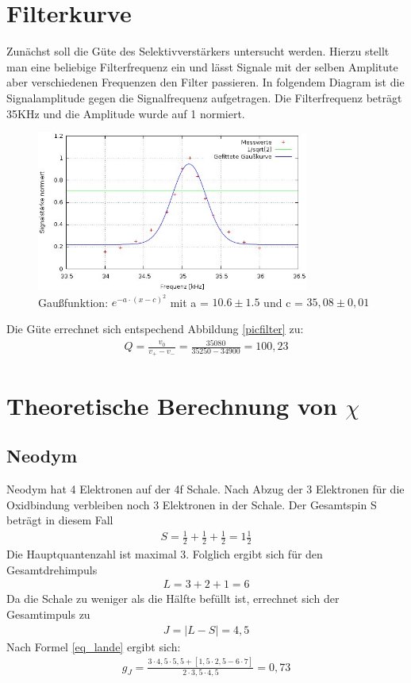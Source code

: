 \section{Filterkurve}
Zunächst soll die Güte des Selektivverstärkers untersucht werden. Hierzu stellt man eine beliebige Filterfrequenz ein und lässt Signale mit der selben Amplitute aber verschiedenen Frequenzen den Filter passieren. In folgendem Diagram ist die Signalamplitude gegen die Signalfrequenz aufgetragen. Die Filterfrequenz beträgt 35KHz und die Amplitude wurde auf 1 normiert.
\begin{figure}[htbp]
\includegraphics[width=0.8\textwidth]{pics/guete.jpg}
\caption{Gaußfunktion: $e^{-a\cdot (x-c)^2}$ mit a = $10.6\pm 1.5$ und c = $35,08 \pm 0,01$}
\end{figure}

Die Güte errechnet sich entspechend Abbildung \ref{picfilter} zu:
\begin{align*}
Q=\frac{v_0}{v_+ - v_-}=\frac{35080}{35250-34900}=100,23
\end{align*}

\section{Theoretische Berechnung von $\chi$}
\subsection{Neodym }
Neodym hat 4 Elektronen auf der 4f Schale. Nach Abzug der 3 Elektronen für die Oxidbindung verbleiben noch 3 Elektronen in der Schale. Der Gesamtspin S beträgt in diesem Fall 
\begin{align*}
S=\frac{1}{2}+ \frac{1}{2}+ \frac{1}{2} = 1 \frac{1}{2}
\end{align*}
Die Hauptquantenzahl ist maximal 3. Folglich ergibt sich für den Gesamtdrehimpuls \begin{align*}
L=3+2+1=6
\end{align*}
Da die Schale zu weniger als die Hälfte befüllt ist, errechnet sich der Gesamtimpuls zu 
\begin{align*}
J=|L-S|=4,5
\end{align*}
Nach Formel \eqref{eq_lande} ergibt sich:
\begin{align}
g_J=\frac{3\cdot4,5\cdot5,5+[1,5\cdot2,5-6\cdot7]}{2\cdot 3,5\cdot4,5}=0,73
\end{align}\\

